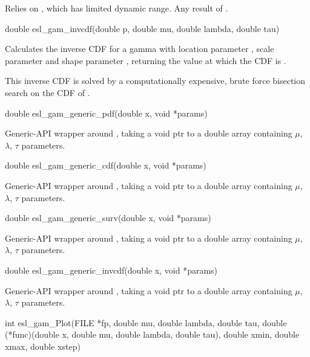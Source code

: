 \begin{sreapi}
Relies on , which has limited
dynamic range. Any result of .


\hypertarget{func:esl_gam_invcdf()}
{\item[double esl\_gam\_invcdf(double p, double mu, double lambda, double tau)]}

Calculates the inverse CDF for a gamma with location
parameter , scale parameter  and shape
parameter , returning the value  at which the
CDF is .

This inverse CDF is solved by a computationally expensive,
brute force bisection search on the CDF of .


\hypertarget{func:esl_gam_generic_pdf()}
{\item[double esl\_gam\_generic\_pdf(double x, void *params)]}

Generic-API wrapper around , taking 
a void ptr to a double array containing $\mu$, $\lambda$,
$\tau$ parameters.


\hypertarget{func:esl_gam_generic_cdf()}
{\item[double esl\_gam\_generic\_cdf(double x, void *params)]}

Generic-API wrapper around , taking 
a void ptr to a double array containing $\mu$, $\lambda$,
$\tau$ parameters.


\hypertarget{func:esl_gam_generic_surv()}
{\item[double esl\_gam\_generic\_surv(double x, void *params)]}

Generic-API wrapper around , taking 
a void ptr to a double array containing $\mu$, $\lambda$,
$\tau$ parameters.


\hypertarget{func:esl_gam_generic_invcdf()}
{\item[double esl\_gam\_generic\_invcdf(double x, void *params)]}

Generic-API wrapper around , taking 
a void ptr to a double array containing $\mu$, $\lambda$,
$\tau$ parameters.


\hypertarget{func:esl_gam_Plot()}
{\item[int esl\_gam\_Plot(FILE *fp, double mu, double lambda, double tau,
	     double (*func)(double x, double mu, double lambda, double tau), 
	     double xmin, double xmax, double xstep)]}


\end{sreapi}
